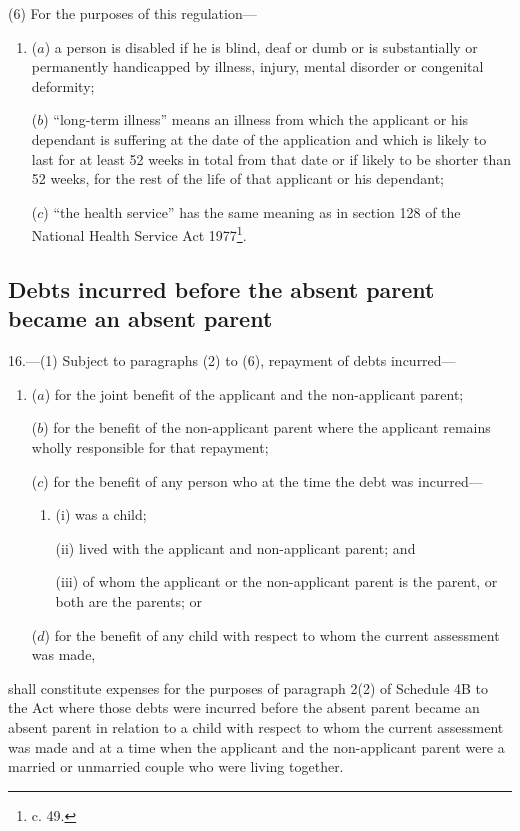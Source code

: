 \documentclass[a4paper]{article}
\begin{document}
(6) For the purposes of this regulation—
\begin{enumerate}\item[]
($a$) a person is disabled if he is blind, deaf or dumb or is substantially or permanently handicapped by illness, injury, mental disorder or congenital deformity;

($b$) “long-term illness” means an illness from which the applicant or his dependant is suffering at the date of the application and which is likely to last for at least 52 weeks in total from that date or if likely to be shorter than 52 weeks, for the rest of the life of that applicant or his dependant;

($c$) “the health service” has the same meaning as in section 128 of the National Health Service Act 1977\footnote{ c. 49.}.
\end{enumerate}

\subsection[16. Debts incurred before the absent parent became an absent parent]{Debts incurred before the absent parent became an absent parent}

16.—(1) Subject to paragraphs (2) to (6), repayment of debts incurred—
\begin{enumerate}\item[]
($a$) for the joint benefit of the applicant and the non-applicant parent;

($b$) for the benefit of the non-applicant parent where the applicant remains wholly responsible for that repayment;

($c$) for the benefit of any person who at the time the debt was incurred—
\begin{enumerate}\item[]
(i) was a child;

(ii) lived with the applicant and non-applicant parent; and

(iii) of whom the applicant or the non-applicant parent is the parent, or both are the parents; or
\end{enumerate}

($d$) for the benefit of any child with respect to whom the current assessment was made,
\end{enumerate}
shall constitute expenses for the purposes of paragraph 2(2) of Schedule 4B to the Act where those debts were incurred before the absent parent became an absent parent in relation to a child with respect to whom the current assessment was made and at a time when the applicant and the non-applicant parent were a married or unmarried couple who were living together.
\end{document}
